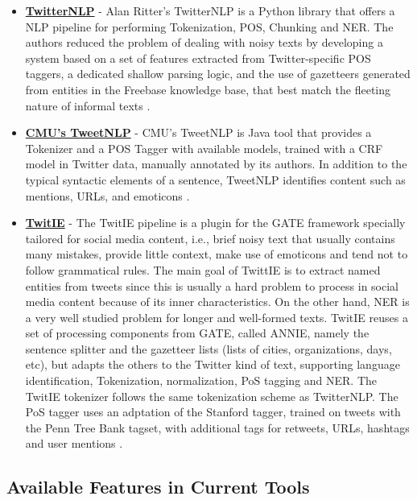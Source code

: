 \begin{itemize}
	\item \textbf{\href{https://github.com/aritter/twitter_nlp}{TwitterNLP}} -  Alan Ritter's TwitterNLP is a Python library that offers a NLP pipeline for performing Tokenization, POS, Chunking and NER. The authors reduced the problem of dealing with noisy texts by developing a system based on a set of features extracted from Twitter-specific POS taggers, a dedicated shallow parsing logic, and the use of gazetteers generated from entities in the Freebase knowledge base, that best match the fleeting nature of informal texts \citep{Ritter2011TwitterNLP}.

	\item \textbf{\href{http://www.cs.cmu.edu/~ark/TweetNLP}{CMU's TweetNLP}} - CMU's TweetNLP is Java tool that provides a Tokenizer and a POS Tagger with available models, trained with a CRF model in Twitter data, manually annotated by its authors. In addition to the typical syntactic elements of a sentence, TweetNLP identifies content such as mentions, URLs, and  emoticons \citep{Gimpel2011TweetNLP}.
     
	 \item \textbf{\href{https://gate.ac.uk/wiki/twitie.html}{TwitIE}} - The TwitIE pipeline is a plugin for the GATE framework specially tailored for social media content, i.e., brief noisy text that usually contains many mistakes, provide little context, make use of emoticons and tend not to follow grammatical rules. The main goal of TwittIE is to extract named entities from tweets since this is usually a hard problem to process in social media content because of its inner characteristics. On the other hand, NER is a very well studied problem for longer and well-formed texts. TwitIE reuses a set of processing components from GATE, called  ANNIE, namely the sentence splitter and the gazetteer lists (lists of cities, organizations, days, etc), but adapts the others to the Twitter kind of text, supporting language identification, Tokenization, normalization, PoS tagging and NER. The TwitIE tokenizer follows the same tokenization scheme as TwitterNLP. The PoS tagger uses an adptation of the Stanford tagger, trained on tweets with the Penn Tree Bank tagset, with additional tags for retweets, URLs, hashtags and user mentions \cite{Bontcheva2013Twitie}.
\end{itemize}

\subsection{Available Features in Current Tools}

